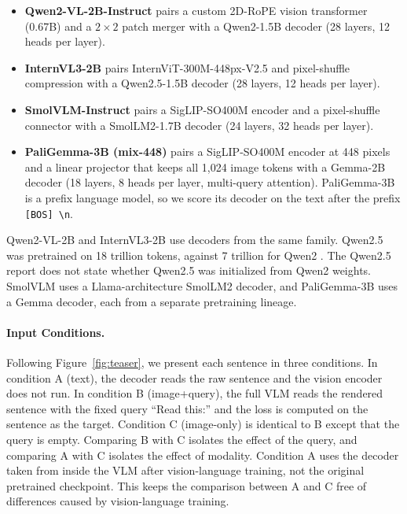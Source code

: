\documentclass[10pt]{article}
\begin{document}
\begin{itemize}
    \item \textbf{Qwen2-VL-2B-Instruct} \citep{wang2024qwen2vl} pairs a custom 2D-RoPE vision transformer (0.67B) and a $2{\times}2$ patch merger with a Qwen2-1.5B decoder (28 layers, 12 heads per layer).
    \item \textbf{InternVL3-2B} \citep{zhu2025internvl3} pairs InternViT-300M-448px-V2.5 and pixel-shuffle compression with a Qwen2.5-1.5B decoder (28 layers, 12 heads per layer).
    \item \textbf{SmolVLM-Instruct} \citep{marafioti2025smolvlm} pairs a SigLIP-SO400M encoder \citep{zhai2023sigmoid} and a pixel-shuffle connector with a SmolLM2-1.7B decoder (24 layers, 32 heads per layer).
    \item \textbf{PaliGemma-3B (mix-448)} \citep{beyer2024paligemma} pairs a SigLIP-SO400M encoder at 448 pixels and a linear projector that keeps all 1,024 image tokens with a Gemma-2B decoder (18 layers, 8 heads per layer, multi-query attention). PaliGemma-3B is a prefix language model, so we score its decoder on the text after the prefix \texttt{[BOS]\,\textbackslash n}.
\end{itemize}

Qwen2-VL-2B and InternVL3-2B use decoders from the same family. Qwen2.5 was pretrained on 18 trillion tokens, against 7 trillion for Qwen2 \citep{qwen2024qwen25}. The Qwen2.5 report does not state whether Qwen2.5 was initialized from Qwen2 weights. SmolVLM uses a Llama-architecture SmolLM2 decoder, and PaliGemma-3B uses a Gemma decoder, each from a separate pretraining lineage.

\paragraph{Input Conditions.}
Following Figure~\ref{fig:teaser}, we present each sentence in three conditions. In condition A (text), the decoder reads the raw sentence and the vision encoder does not run. In condition B (image+query), the full VLM reads the rendered sentence with the fixed query ``Read this:'' and the loss is computed on the sentence as the target. Condition C (image-only) is identical to B except that the query is empty. Comparing B with C isolates the effect of the query, and comparing A with C isolates the effect of modality. Condition A uses the decoder taken from inside the VLM after vision-language training, not the original pretrained checkpoint. This keeps the comparison between A and C free of differences caused by vision-language training.
\end{document}
